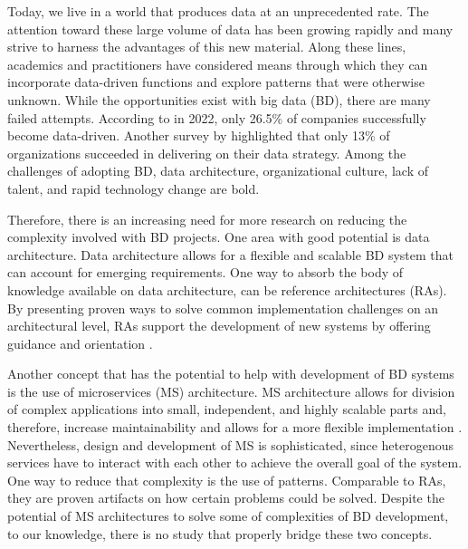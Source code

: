 \documentclass[a4paper,11pt,article,oneside]{memoir}
\begin{document}
Today, we live in a world that produces data at an unprecedented rate. The attention toward these large volume of data has been growing rapidly and many strive to harness the advantages of this new material. Along these lines, academics and practitioners have considered means through which they can incorporate data-driven functions and explore patterns that were otherwise unknown. While the opportunities exist with big data (BD), there are many failed attempts. According to \citet{NewVantageSurvey} in 2022, only 26.5\% of companies successfully become data-driven. Another survey by \citet{DataBricksSurvey} highlighted that only 13\% of organizations succeeded in delivering on their data strategy. Among the challenges of adopting BD, data architecture, organizational culture, lack of talent, and rapid technology change are bold. 

Therefore, there is an increasing need for more research on reducing the complexity involved with BD projects. One area with good potential is data architecture. Data architecture allows for a flexible and scalable BD system that can account for emerging requirements. One way to absorb the body of knowledge available on data architecture, can be reference architectures (RAs). By presenting proven ways to solve common implementation challenges on an architectural level, RAs support the development of new systems by offering guidance and orientation \citep{ataei2022state}.





% 


Another concept that has the potential to help with development of BD systems is the use of microservices (MS) architecture. MS architecture allows for division of complex applications into small, independent, and highly scalable parts and, therefore, increase maintainability and allows for a more flexible implementation \citep[p.~20]{Richardson.2022}. Nevertheless, design and development of MS is sophisticated, since heterogenous services have to interact with each other to achieve the overall goal of the system. One way to reduce that complexity is the use of patterns. Comparable to RAs, they are proven artifacts on how certain problems could be solved. Despite the potential of MS architectures to solve some of complexities of BD development, to our knowledge, there is no study that properly bridge these two concepts. 
\end{document}
